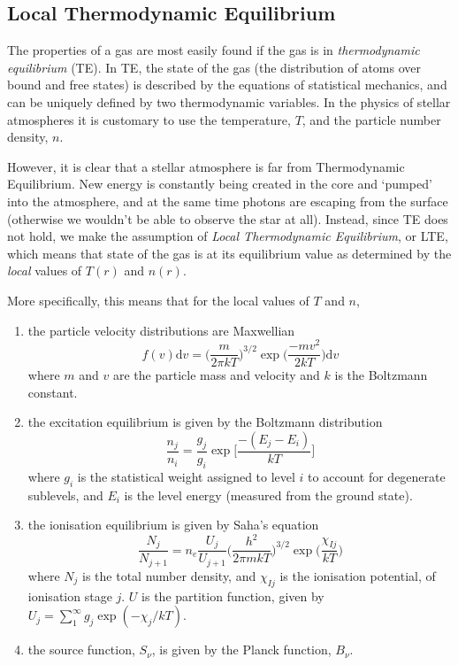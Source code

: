 \subsection{Local Thermodynamic Equilibrium}

The properties of a gas are most easily found if the gas is in
\emph{thermodynamic equilibrium} (TE). In TE, the state of the gas (the
distribution of atoms over bound and free states) is described by the
equations of statistical mechanics, and can be uniquely defined by two
thermodynamic variables. In the physics of stellar atmospheres it is
customary to use the temperature, $T$, and the particle number density, $n$.

However, it is clear that a stellar atmosphere is far from
Thermodynamic Equilibrium. New energy is constantly being created in
the core and `pumped' into the atmosphere, and at the same time
photons are escaping from the surface (otherwise we wouldn't be able
to observe the star at all). Instead, since TE does not hold, we make
the assumption of \emph{Local Thermodynamic Equilibrium}, or LTE,
which means that state of the gas is at its equilibrium value as
determined by the \emph{local} values of $T(r)$ and $n(r)$.

More specifically, this means that for the local values of $T$ and $n$,

\renewcommand{\theenumi}{\roman{enumi}}
\renewcommand{\labelenumi}{(\theenumi)}
\begin{enumerate}
\item	the particle velocity distributions are Maxwellian
	\begin{equation}
	f(v)\mathrm{d}v = \biggl( \frac{m}{2\pi kT}\biggr)^{3/2}
		\exp\biggl(\frac{-mv^2}{2kT}\biggr)\mathrm{d}v
	\end{equation}
	where $m$ and $v$ are the particle mass and velocity and $k$
	is the Boltzmann constant.

\item	the excitation equilibrium is given by the Boltzmann
	distribution
	\begin{equation}
	\frac{n_j}{n_i} = \frac{g_j}{g_i}
	\exp\biggl[\frac{-(E_j - E_i)}{kT}\biggr]
	\end{equation}
	where $g_{i}$ is the statistical weight assigned to level
	$i$ to account for degenerate sublevels, and $E_{i}$ is the
	level energy (measured from the ground state).

\item	the ionisation equilibrium is given by Saha's equation
	\begin{equation}
	\frac{N_j}{N_{j+1}} = n_e\frac{U_j}{U_{j+1}}
		\biggl(\frac{h^2}{2\pi mkT}\biggr)^{3/2}
		\exp \biggl(\frac{\chi_{Ij}}{kT}\biggr)
	\end{equation}
	where $N_j$ is the total number density, and $\chi_{Ij}$ is the ionisation potential,
	of ionisation stage $j$. $U$ is the partition function, given by
	$U_j = \sum_1^\infty g_j \exp (-\chi_j/kT)$.

\item	the source function, $S_\nu$, is given by the Planck
	function, $B_\nu$.
\end{enumerate}
\renewcommand{\theenumi}{\arabic{enumi}}
\renewcommand{\labelenumi}{\theenumi.}

